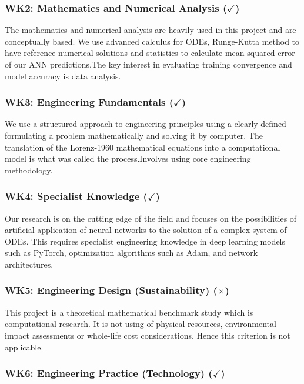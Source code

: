 \subsubsection{WK2: Mathematics and Numerical Analysis ($\checkmark$)}

The mathematics and numerical analysis are heavily used in this project and are conceptually based. We use advanced calculus for ODEs, Runge-Kutta method to have reference numerical solutions and statistics to calculate mean squared error of our ANN predictions.The key interest in evaluating training convergence and model accuracy is data analysis.


\subsubsection{WK3: Engineering Fundamentals ($\checkmark$)}

We use a structured approach to engineering principles using a clearly defined formulating a problem mathematically and solving it by computer. The translation of the Lorenz-1960 mathematical equations into a computational model is what was called the process.Involves using core engineering methodology.


\subsubsection{WK4: Specialist Knowledge ($\checkmark$)}

Our research is on the cutting edge of the field and focuses on the possibilities of artificial application of neural networks to the solution of a complex system of ODEs. This requires specialist engineering knowledge in deep learning models such as PyTorch, optimization algorithms such as Adam,
and network architectures.


\subsubsection{WK5: Engineering Design (Sustainability) ($\times$)}

This project is a theoretical mathematical benchmark study which is computational research. It is not using of physical resources, environmental impact assessments or whole-life cost considerations. Hence this criterion is not applicable.


\subsubsection{WK6: Engineering Practice (Technology) ($\checkmark$)}

